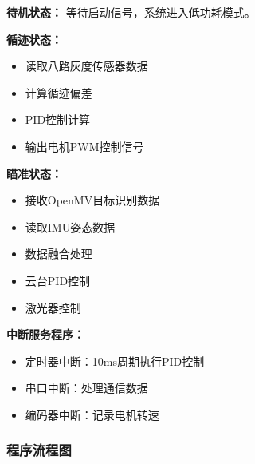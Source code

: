 \documentclass[UTF-8,zihao=-4]{ctexart}
\begin{document}
    \textbf{待机状态：}
    等待启动信号，系统进入低功耗模式。
    
    \textbf{循迹状态：}
    \begin{itemize}
        \item 读取八路灰度传感器数据
        \item 计算循迹偏差
        \item PID控制计算
        \item 输出电机PWM控制信号
    \end{itemize}
    
    \textbf{瞄准状态：}
    \begin{itemize}
        \item 接收OpenMV目标识别数据
        \item 读取IMU姿态数据
        \item 数据融合处理
        \item 云台PID控制
        \item 激光器控制
    \end{itemize}
    
    \textbf{中断服务程序：}
    \begin{itemize}
        \item 定时器中断：10ms周期执行PID控制
        \item 串口中断：处理通信数据
        \item 编码器中断：记录电机转速
    \end{itemize}
\subsubsection{程序流程图}
    
\end{document}

